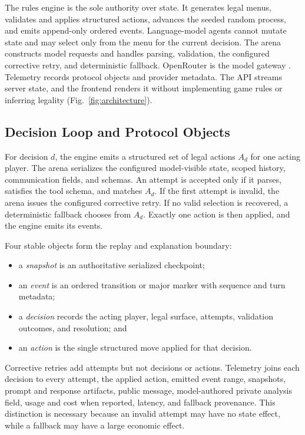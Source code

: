 \documentclass[conference]{IEEEtran}
\begin{document}
The rules engine is the sole authority over state. It generates legal menus,
validates and applies structured actions, advances the seeded random process,
and emits append-only ordered events. Language-model agents cannot mutate
state and may select only from the menu for the current decision. The arena
constructs model requests and handles parsing, validation, the configured
corrective retry, and deterministic fallback. OpenRouter is the model gateway
\cite{openrouter_docs}. Telemetry records protocol objects and provider
metadata. The API
streams server state, and the frontend renders it without implementing game
rules or inferring legality (Fig.~\ref{fig:architecture}).

\subsection{Decision Loop and Protocol Objects}
\label{sec:decision_loop}

For decision $d$, the engine emits a structured set of legal actions $A_d$ for
one acting player. The arena serializes the configured model-visible state,
scoped history, communication fields, and schemas. An attempt is accepted only
if it parses, satisfies the tool schema, and matches $A_d$. If the first
attempt is invalid, the arena issues the configured corrective retry. If no
valid selection is recovered, a deterministic fallback chooses from $A_d$.
Exactly one action is then applied, and the engine emits its events.

Four stable objects form the replay and explanation boundary:
\begin{itemize}
    \item a \emph{snapshot} is an authoritative serialized checkpoint;
    \item an \emph{event} is an ordered transition or major marker with
    sequence and turn metadata;
    \item a \emph{decision} records the acting player, legal surface,
    attempts, validation outcomes, and resolution; and
    \item an \emph{action} is the single structured move applied for that
    decision.
\end{itemize}
Corrective retries add attempts but not decisions or actions. Telemetry joins
each decision to every attempt, the applied action, emitted event range,
snapshots, prompt and response artifacts, public message, model-authored
private analysis field, usage and cost when reported, latency, and fallback
provenance.
This distinction is
necessary because an invalid attempt may have no state effect, while a
fallback may have a large economic effect.
\end{document}
